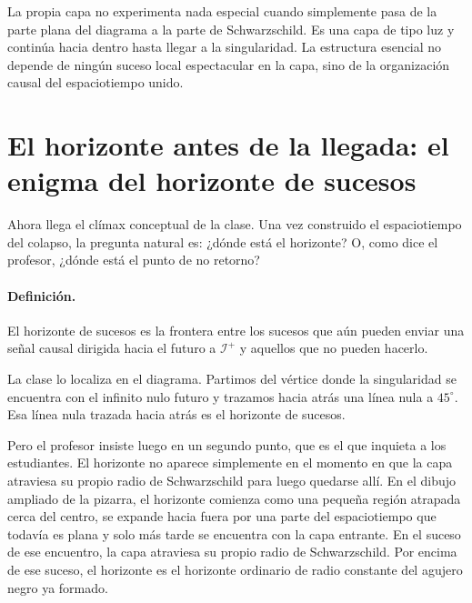 La propia capa no experimenta nada especial cuando simplemente pasa de la parte plana del diagrama a la parte de Schwarzschild. Es una capa de tipo luz y continúa hacia dentro hasta llegar a la singularidad. La estructura esencial no depende de ningún suceso local espectacular en la capa, sino de la organización causal del espaciotiempo unido.

\begin{classroomqa}
\end{classroomqa}

\section{El horizonte antes de la llegada: el enigma del horizonte de sucesos}

Ahora llega el clímax conceptual de la clase. Una vez construido el espaciotiempo del colapso, la pregunta natural es: ¿dónde está el horizonte? O, como dice el profesor, ¿dónde está el punto de no retorno?

\paragraph{Definición.} El horizonte de sucesos es la frontera entre los sucesos que aún pueden enviar una señal causal dirigida hacia el futuro a \(\mathcal{I}^+\) y aquellos que no pueden hacerlo.

La clase lo localiza en el diagrama. Partimos del vértice donde la singularidad se encuentra con el infinito nulo futuro y trazamos hacia atrás una línea nula a \(45^\circ\). Esa línea nula trazada hacia atrás es el horizonte de sucesos.

Pero el profesor insiste luego en un segundo punto, que es el que inquieta a los estudiantes. El horizonte no aparece simplemente en el momento en que la capa atraviesa su propio radio de Schwarzschild para luego quedarse allí. En el dibujo ampliado de la pizarra, el horizonte comienza como una pequeña región atrapada cerca del centro, se expande hacia fuera por una parte del espaciotiempo que todavía es plana y solo más tarde se encuentra con la capa entrante. En el suceso de ese encuentro, la capa atraviesa su propio radio de Schwarzschild. Por encima de ese suceso, el horizonte es el horizonte ordinario de radio constante del agujero negro ya formado.

